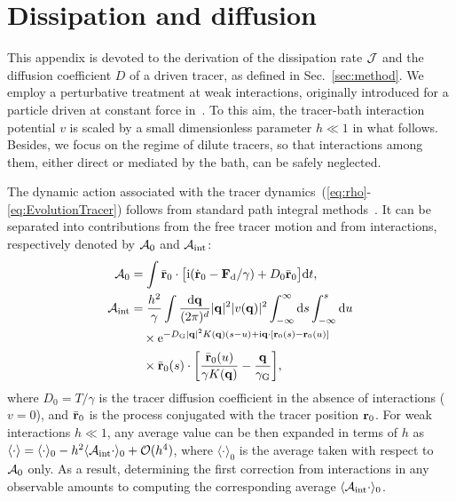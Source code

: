 \documentclass[superscriptaddress, twocolumn, prx, longbibliography, nofootinbib]{revtex4-1}
\begin{document}


\section{Dissipation and diffusion}\label{app:diff}

This appendix is devoted to the derivation of the dissipation rate $\cal J$ and the diffusion coefficient $D$ of a driven tracer, as defined in Sec.~\ref{sec:method}. We employ a perturbative treatment at weak interactions, originally introduced for a particle driven at constant force in~\cite{Demery2011, Demery2014}. To this aim, the tracer-bath interaction potential $v$ is scaled by a small dimensionless parameter $h\ll1$ in what follows. Besides, we focus on the regime of dilute tracers, so that interactions among them, either direct or mediated by the bath, can be safely neglected.


The dynamic action associated with the tracer dynamics~(\ref{eq:rho}-\ref{eq:EvolutionTracer}) follows from standard path integral methods~\cite{Martin1973, Dominicis1975}. It can be separated into contributions from the free tracer motion and from interactions, respectively denoted by ${\cal A}_0$ and ${\cal A}_{\rm int}$:
\begin{equation}\label{eq:action_app}
	\begin{aligned}
		{\cal A}_0 &= \int \bar{\bf r}_0 \cdot \big[ {\rm i}(\dot{\bf r}_0 - {\bf F}_{\rm d}/\gamma) + D_0 \bar{\bf r}_0 \big] {\rm d}t ,
		\\
		{\cal A}_{\rm int} &= \frac{h^2}{\gamma} \int \frac{{\rm d}{\bf q}}{(2\pi)^d} |{\bf q}|^2 |v({\bf q})|^2 \int_{-\infty}^\infty {\rm d}s\int_{-\infty}^s{\rm d}u
		\\
		&\quad\times {\rm e}^{-D_{\rm G}|{\bf q}|^2K({\bf q})(s-u)+{\rm i}{\bf q}\cdot[{\bf r}_0(s)-{\bf r}_0(u)]}
		\\
		&\quad\times \bar{\bf r}_0(s) \cdot \bigg[ \frac{\bar{\bf r}_0(u)}{\gamma K({\bf q})} - \frac{{\bf q}}{\gamma_{\rm G}} \bigg] ,
	\end{aligned}
\end{equation}
where $D_0=T/\gamma$ is the tracer diffusion coefficient in the absence of interactions ($v=0$), and $\bar{\bf r}_0$ is the process conjugated with the tracer position ${\bf r}_0$. For weak interactions $h\ll1$, any average value can be then expanded in terms of $h$ as $\langle\cdot\rangle=\langle\cdot\rangle_0 - h^2 \langle{\cal A}_{\rm int}\cdot\rangle_0 + {\cal O}(h^4)$, where $\langle\cdot\rangle_0$ is the average taken with respect to ${\cal A}_0$ only. As a result, determining the first correction from interactions in any observable amounts to computing the corresponding average $\langle{\cal A}_{\rm int}\cdot\rangle_0$.
\end{document}
